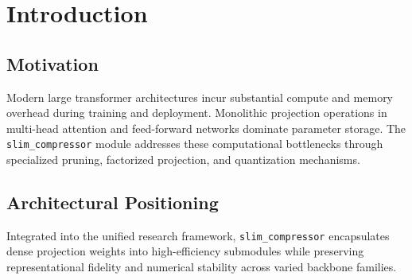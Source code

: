 \section{Introduction}

\subsection{Motivation}
Modern large transformer architectures incur substantial compute and memory overhead during training and deployment. Monolithic projection operations in multi-head attention and feed-forward networks dominate parameter storage. The \texttt{slim_compressor} module addresses these computational bottlenecks through specialized pruning, factorized projection, and quantization mechanisms.

\subsection{Architectural Positioning}
Integrated into the unified research framework, \texttt{slim_compressor} encapsulates dense projection weights into high-efficiency submodules while preserving representational fidelity and numerical stability across varied backbone families.
